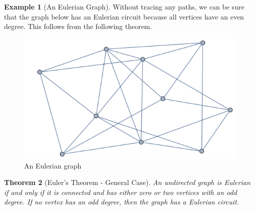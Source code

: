 \documentclass[10pt,]{book}
\theoremstyle{plain}
\newtheorem{theorem}{Theorem}[section]
\theoremstyle{definition}
\theoremstyle{definition}
\theoremstyle{definition}
\newtheorem{example}[theorem]{Example}
\theoremstyle{definition}
\theoremstyle{definition}
\numberwithin{equation}{section}
\begin{document}
\begin{example}[An Eulerian Graph]\label{ex-an-eulerian-graph}
Without tracing any paths, we can be sure that the graph below has an Eulerian circuit because all vertices have an even
degree. This follows from the following theorem.
%
\leavevmode%
\begin{figure}
\centering
\includegraphics[width=1\linewidth]{images/fig-eulerian-9-4.png}
\caption{An Eulerian graph
                \label{fig-eulerian-9-4}}
\end{figure}
\end{example}
\begin{theorem}[Euler's Theorem - General Case]\label{theorem-euler-theorem-general}
An undirected graph is Eulerian if and only if it is connected and has either zero or two vertices with an odd degree. If no vertex has an odd degree, then the graph has a Eulerian circuit.%
\end{theorem}
\end{document}
